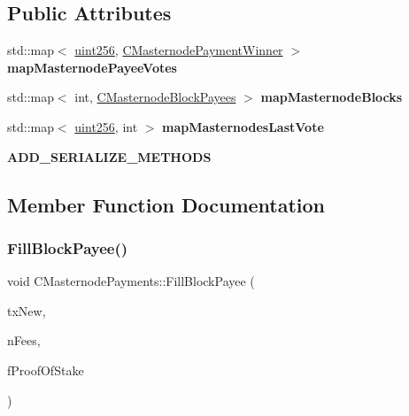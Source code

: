 \subsection*{Public Attributes}
\begin{DoxyCompactItemize}
\item 
\mbox{\label{class_c_masternode_payments_ab88cc3dc744299f7ac159ec44d9225ef}} 
std\+::map$<$ \mbox{\hyperlink{classuint256}{uint256}}, \mbox{\hyperlink{class_c_masternode_payment_winner}{C\+Masternode\+Payment\+Winner}} $>$ {\bfseries map\+Masternode\+Payee\+Votes}
\item 
\mbox{\label{class_c_masternode_payments_a6feb2c94183cd649ede84dc38d3ae442}} 
std\+::map$<$ int, \mbox{\hyperlink{class_c_masternode_block_payees}{C\+Masternode\+Block\+Payees}} $>$ {\bfseries map\+Masternode\+Blocks}
\item 
\mbox{\label{class_c_masternode_payments_a189376c929b638e6ba7dbf6a0b34b545}} 
std\+::map$<$ \mbox{\hyperlink{classuint256}{uint256}}, int $>$ {\bfseries map\+Masternodes\+Last\+Vote}
\item 
\mbox{\label{class_c_masternode_payments_a0f90877d276308aa16314dcaa84f332c}} 
{\bfseries A\+D\+D\+\_\+\+S\+E\+R\+I\+A\+L\+I\+Z\+E\+\_\+\+M\+E\+T\+H\+O\+DS}
\end{DoxyCompactItemize}


\subsection{Member Function Documentation}
\mbox{\label{class_c_masternode_payments_a459bf2e3a7e56743663026fd8f6d768d}} 
\subsubsection{\texorpdfstring{FillBlockPayee()}{FillBlockPayee()}}
{\footnotesize\ttfamily void C\+Masternode\+Payments\+::\+Fill\+Block\+Payee (\begin{DoxyParamCaption}\item[{\mbox{\hyperlink{struct_c_mutable_transaction}{C\+Mutable\+Transaction}} \&}]{tx\+New,  }\item[{int64\+\_\+t}]{n\+Fees,  }\item[{bool}]{f\+Proof\+Of\+Stake }\end{DoxyParamCaption})}

